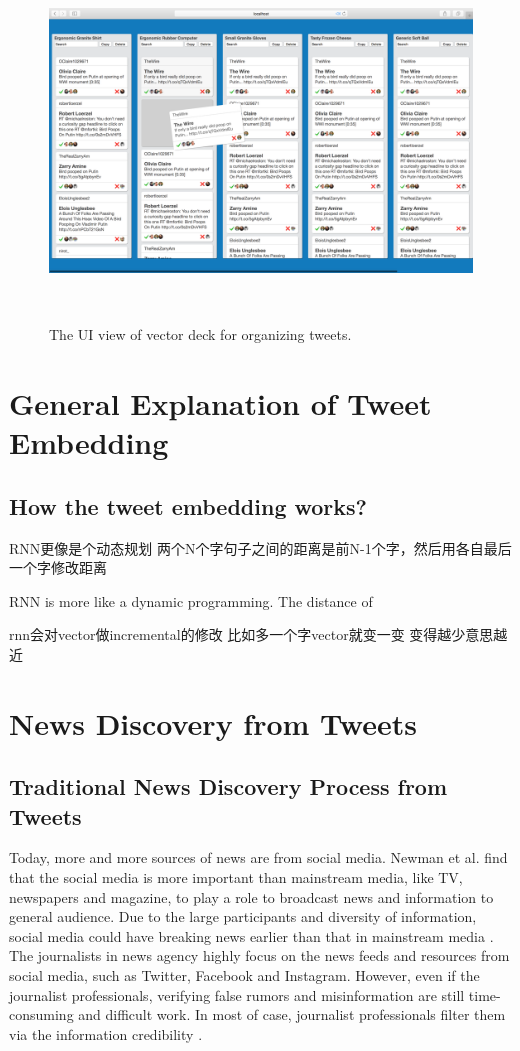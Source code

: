 \begin{figure}[thb!]
    \includegraphics[width= \textwidth]{images/vector_deck}
   \caption{The UI view of vector deck for organizing tweets.  } ~\label{fig: vector_deck}
\end{figure}


\section{General Explanation of Tweet Embedding}

\subsection{How the tweet embedding works?}


RNN更像是个动态规划
两个N个字句子之间的距离是前N-1个字，然后用各自最后一个字修改距离



RNN is more like a dynamic programming. The distance of 

rnn会对vector做incremental的修改
比如多一个字vector就变一变
变得越少意思越近




\section{News Discovery from Tweets}

\subsection{Traditional News Discovery Process from Tweets}
Today, more and more sources of news are from social media. Newman et al. \cite{Newman2011} find that the social media is more important than mainstream media, like TV, newspapers and magazine, to play a role to broadcast news and information to general audience. Due to the large participants and diversity of information, social media could have breaking news earlier than that in mainstream media \cite{Kwak2010}. The journalists in news agency highly focus on the news feeds and resources from social media, such as Twitter, Facebook and Instagram. However, even if the journalist professionals, verifying false rumors and misinformation are still time-consuming and difficult work. In most of case, journalist professionals filter them via the information credibility \cite{Silverman2014}. 

